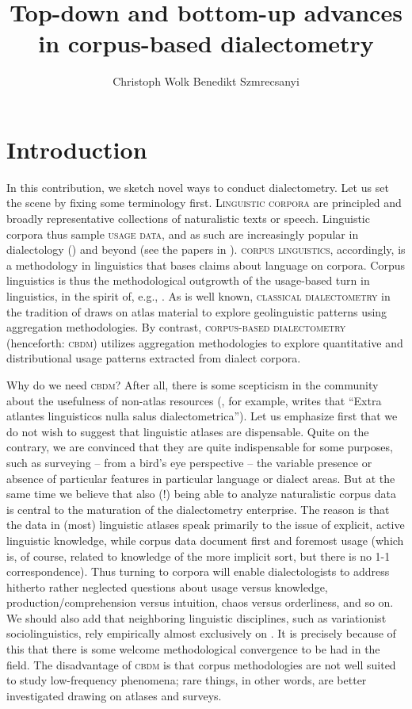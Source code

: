 \documentclass[output=paper]{LSP/langsci}
\author{Christoph Wolk\affiliation{University of Giessen} \lastand Benedikt Szmrecsanyi\affiliation{KU Leuven}}
\title{Top-down and bottom-up advances in corpus-based dialectometry}
\begin{document}
  

\section{Introduction}

In this contribution, we sketch novel ways to conduct dialectometry. Let us set the scene by fixing some terminology first. \textsc{Linguistic corpora} are principled and broadly representative collections of naturalistic texts or speech. Linguistic corpora thus sample \textsc{usage data}, and as such are increasingly popular in dialectology (\citealt{anderwald_corpus_2009,grieve_corpus-based_2009}) and beyond (see the papers in \citealt{szmrecsanyi_aggregating_2014}). \textsc{corpus linguistics}, accordingly, is a methodology in linguistics that bases claims about language on corpora. Corpus linguistics is thus the methodological outgrowth of the usage-based turn in linguistics, in the spirit of, e.g.,  \citet{bybee_language_2010,tomasello_constructing_2003}. As is well known, \textsc{classical dialectometry} in the tradition of \citet{goebl_dialektometrische_1984,nerbonne_edit_1999} draws on atlas material to explore geolinguistic patterns using aggregation methodologies. By contrast, \textsc{corpus-based dialectometry} (henceforth: \textsc{cbdm}) utilizes aggregation methodologies to explore quantitative and distributional usage patterns extracted from dialect corpora.

Why do we need \textsc{cbdm}? 
After all, there is some scepticism in the community about the usefulness of non-atlas resources (\citealt[499]{goebl_dialektometrie_2005}, for example, writes that ``Extra atlantes linguisticos nulla salus dialectometrica'').
Let us emphasize first that we do not wish to suggest that linguistic atlases are dispensable. 
Quite on the contrary, we are convinced that they are quite indispensable for some purposes, such as surveying -- from a bird's eye perspective -- the variable presence or absence of particular features in particular language or dialect areas.
But at the same time we believe that also (!) being able to analyze naturalistic corpus data is central to the maturation of the dialectometry enterprise.
The reason is that the data in (most) linguistic atlases speak primarily to the issue of explicit, active linguistic knowledge, while corpus data document first and foremost usage (which is, of course, related to knowledge of the more implicit sort, but there is no 1-1 correspondence).
Thus turning to corpora will enable dialectologists to address hitherto rather neglected questions about usage versus knowledge,  production/comprehension versus intuition, chaos versus orderliness, and so on. 
We should also add that neighboring linguistic disciplines, such as variationist sociolinguistics, rely empirically almost exclusively on . 
It is precisely because of this that there is some welcome methodological convergence to be had in the field. 
The disadvantage of \textsc{cbdm} is that corpus methodologies are not well suited to study low-frequency phenomena; rare things, in other words, are better investigated drawing on atlases and surveys.
\end{document}
